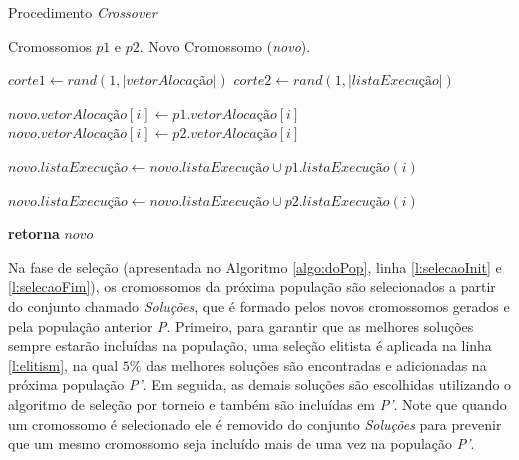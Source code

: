 \begin{algorithm}[H]
\caption{Procedimento \textit{Crossover}}\label{algo:crossover}

\begin{algorithmic}[1]
\Require Cromossomos $p1$ e $p2$.
\Ensure Novo Cromossomo (\textit{novo}).

    \State $corte1 \gets rand(1, |\textit{vetorAlocação}|)$\label{l:corte1}
    \State $corte2 \gets rand(1, |\textit{listaExecução}|)$\label{l:corte2}
    
            \State $novo.\textit{vetorAlocação}[i] \gets p1.\textit{vetorAlocação}[i]$
        \Else
            \State $novo.\textit{vetorAlocação}[i] \gets p2.\textit{vetorAlocação}[i]$        
        \EndIf
        
         \label{l:lista1}
            \State $ novo.\textit{listaExecução} \gets novo.\textit{listaExecução} \cup p1.\textit{listaExecução}(i) $
        \EndIf
        
    \EndFor
    
            \State $ novo.\textit{listaExecução} \gets novo.\textit{listaExecução} \cup p2.\textit{listaExecução}(i) $
        \EndIf        
    \EndFor \label{l:lista2}

    
    \State \textbf{retorna} $novo$

\end{algorithmic}
\end{algorithm}


Na fase de seleção (apresentada no Algoritmo \ref{algo:doPop}, linha \ref{l:selecaoInit} e \ref{l:selecaoFim}), os cromossomos da próxima população são selecionados a partir do conjunto chamado \textit{Soluções}, que é formado pelos novos cromossomos gerados e pela população anterior \textit{P}. Primeiro, para garantir que as melhores soluções sempre estarão incluídas na população, uma seleção elitista é aplicada na linha \ref{l:elitism}, na qual $5\%$ das melhores soluções são encontradas e adicionadas na próxima população \textit{P'}. Em seguida, as demais soluções são escolhidas utilizando o algoritmo de seleção por torneio e também são incluídas em \textit{P'}. Note que quando um cromossomo é selecionado ele é removido do conjunto \textit{Soluções} para prevenir que um mesmo cromossomo seja incluído mais de uma vez na população \textit{P'}.


